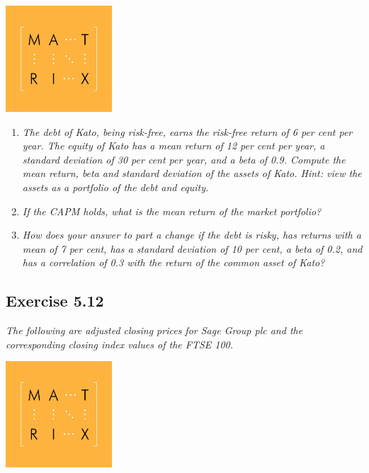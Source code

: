 \documentclass[]{book}
\theoremstyle{definition}
\theoremstyle{definition}
\theoremstyle{remark}
\begin{document}
\begin{center}\includegraphics[width=150px]{figures/matrix} \end{center}

\begin{enumerate}
\def\labelenumi{\alph{enumi}.}
\item
  \emph{The debt of Kato, being risk-free, earns the risk-free return of
  6 per cent per year. The equity of Kato has a mean return of 12 per
  cent per year, a standard deviation of 30 per cent per year, and a
  beta of 0.9. Compute the mean return, beta and standard deviation of
  the assets of Kato. Hint: view the assets as a portfolio of the debt
  and equity.} \citep[p.161]{book}
\item
  \emph{If the CAPM holds, what is the mean return of the market
  portfolio?} \citep[p.161]{book}
\item
  \emph{How does your answer to part a change if the debt is risky, has
  returns with a mean of 7 per cent, has a standard deviation of 10 per
  cent, a beta of 0.2, and has a correlation of 0.3 with the return of
  the common asset of Kato?} \citep[p.161]{book}
\end{enumerate}

\subsection{Exercise 5.12}\label{exercise-5.12}

\emph{The following are adjusted closing prices for Sage Group plc and
the corresponding closing index values of the FTSE 100.}
\citep[p.161]{book}

\begin{center}\includegraphics[width=150px]{figures/matrix} \end{center}
\end{document}
